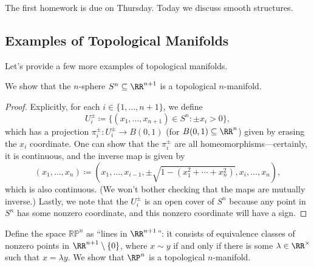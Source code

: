 \documentclass[../notes.tex]{subfiles}
\begin{document}
The first homework is due on Thursday. Today we discuss smooth structures.

\subsection{Examples of Topological Manifolds}
Let's provide a few more examples of topological manifolds.
\begin{exe}[sphere] \label{exe:sphere-top-man}
	We show that the $n$-sphere $S^n\subseteq\RR^{n+1}$ is a topological $n$-manifold.
\end{exe}
\begin{proof}
	Explicitly, for each $i\in\{1,\ldots,n+1\}$, we define
	\[U_i^\pm\coloneqq\{(x_1,\ldots,x_{n+1})\in S^n:\pm x_i>0\},\]
	which has a projection $\pi_i^\pm\colon U_i^\pm\to B(0,1)$ (for $B(0,1)\subseteq\RR^n$) given by erasing the $x_i$ coordinate. One can show that the $\pi_i^\pm$ are all homeomorphisms---certainly, it is continuous, and the inverse map is given by
	\[(x_1,\ldots,x_n)\coloneqq\left(x_1,\ldots,x_{i-1},\pm\sqrt{1-\left(x_1^2+\cdots+x_n^2\right)},x_i,\ldots,x_n\right),\]
	which is also continuous. (We won't bother checking that the maps are mutually inverse.) Lastly, we note that the $U_i^\pm$ is an open cover of $S^n$ because any point in $S^n$ has some nonzero coordinate, and this nonzero coordinate will have a sign.
\end{proof}
\begin{exe}
	Define the space $\mathbb{RP}^n$ as ``lines in $\RR^{n+1}$'': it consists of equivalence classes of nonzero points in $\RR^{n+1}\setminus\{0\}$, where $x\sim y$ if and only if there is some $\lambda\in\RR^\times$ such that $x=\lambda y$. We show that $\RP^n$ is a topological $n$-manifold.
\end{exe}
\end{document}
